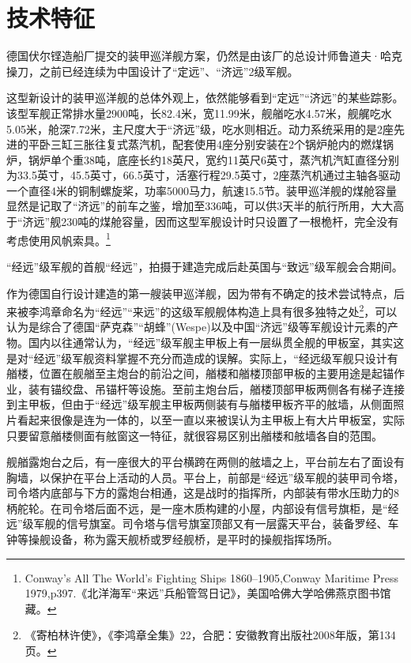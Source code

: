 \documentclass[12pt,UTF8]{ctexbook}
\begin{document}
\section{技术特征}

德国伏尔铿造船厂提交的装甲巡洋舰方案，仍然是由该厂的总设计师鲁道夫·哈克操刀，之前已经连续为中国设计了“定远”、“济远”2级军舰。

这型新设计的装甲巡洋舰的总体外观上，依然能够看到“定远”“济远”的某些踪影。该型军舰正常排水量2900吨，长82.4米，宽11.99米，舰艏吃水4.57米，舰艉吃水5.05米，舱深7.72米，主尺度大于“济远”级，吃水则相近。动力系统采用的是2座先进的平卧三缸三胀往复式蒸汽机，配套使用4座分别安装在2个锅炉舱内的燃煤锅炉，锅炉单个重38吨，底座长约18英尺，宽约11英尺6英寸，蒸汽机汽缸直径分别为33.5英寸，45.5英寸，66.5英寸，活塞行程29.5英寸，2座蒸汽机通过主轴各驱动一个直径4米的铜制螺旋桨，功率5000马力，航速15.5节。装甲巡洋舰的煤舱容量显然是记取了“济远”的前车之鉴，增加至336吨，可以供3天半的航行所用，大大高于“济远”舰230吨的煤舱容量，因而这型军舰设计时只设置了一根桅杆，完全没有考虑使用风帆索具。\footnote{Conway's All The World's Fighting Ships 1860--1905,Conway Maritime Press 1979,p397.《北洋海军“来远”兵船管驾日记》，美国哈佛大学哈佛燕京图书馆藏。}

“经远”级军舰的首舰“经远”，拍摄于建造完成后赴英国与“致远”级军舰会合期间。

作为德国自行设计建造的第一艘装甲巡洋舰，因为带有不确定的技术尝试特点，后来被李鸿章命名为“经远”“来远”的这级军舰舰体构造上具有很多独特之处\footnote{《寄柏林许使》，《李鸿章全集》22，合肥：安徽教育出版社2008年版，第134页。}，可以认为是综合了德国“萨克森”“胡蜂”(Wespe)以及中国“济远”级等军舰设计元素的产物。国内以往通常认为，“经远”级军舰主甲板上有一层纵贯全舰的甲板室，其实这是对“经远”级军舰资料掌握不充分而造成的误解。实际上，“经远级军舰只设计有艏楼，位置在舰艏至主炮台的前沿之间，艏楼和艏楼顶部甲板的主要用途是起锚作业，装有锚绞盘、吊锚杆等设施。至前主炮台后，艏楼顶部甲板两侧各有梯子连接到主甲板，但由于“经远”级军舰主甲板两侧装有与艏楼甲板齐平的舷墙，从侧面照片看起来很像是连为一体的，以至一直以来被误认为主甲板上有大片甲板室，实际只要留意艏楼侧面有舷窗这一特征，就很容易区别出艏楼和舷墙各自的范围。

舰艏露炮台之后，有一座很大的平台横跨在两侧的舷墙之上，平台前左右了面设有胸墙，以保护在平台上活动的人员。平台上，前部是“经远”级军舰的装甲司令塔，司令塔内底部与下方的露炮台相通，这是战时的指挥所，内部装有带水压助力的8柄舵轮。在司令塔后面不远，是一座木质构建的小屋，内部设有信号旗柜，是“经远”级军舰的信号旗室。司令塔与信号旗室顶部又有一层露天平台，装备罗经、车钟等操舰设备，称为露天舰桥或罗经舰桥，是平时的操舰指挥场所。
\end{document}
